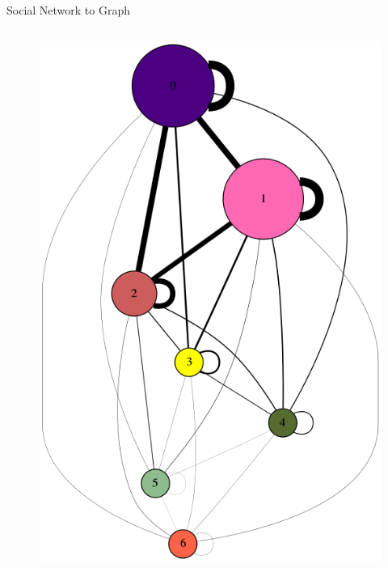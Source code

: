 \begin{frame}[t]{Social Network to Graph}
\begin{columns}
\begin{column}{0.5\textwidth}
\begin{figure}[h]
        \includegraphics[scale=0.15]{img/gdot.png}
        \end{figure}
        \end{column}
    \end{columns}
\end{frame}

%
%
%
%


